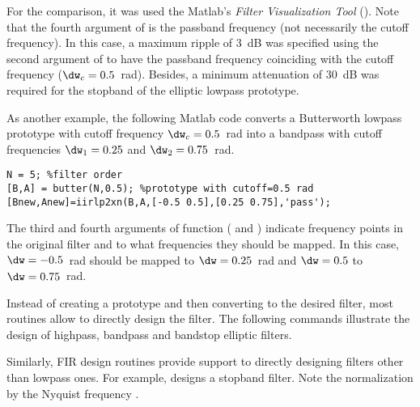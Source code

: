 For the comparison, it was used the Matlab's \emph{Filter Visualization Tool} (). Note that the fourth argument of  is the passband frequency (not necessarily the cutoff frequency). In this case, a maximum ripple of 3~dB was specified using the second argument of  to have the passband frequency coinciding with the cutoff frequency  ($\dw_c=0.5$~rad). Besides, a minimum attenuation of $30$~dB was required for the stopband of the elliptic lowpass prototype.

As another example, the following Matlab code converts a Butterworth lowpass prototype with cutoff frequency $\dw_c=0.5$~rad into a bandpass with cutoff frequencies $\dw_1=0.25$ and $\dw_2=0.75$~rad.
\begin{lstlisting}
N = 5; %filter order
[B,A] = butter(N,0.5); %prototype with cutoff=0.5 rad
[Bnew,Anew]=iirlp2xn(B,A,[-0.5 0.5],[0.25 0.75],'pass');
\end{lstlisting}
The third and fourth arguments of function  (\ci{[-0.5 0.5]} and \ci{[0.25 0.75]}) indicate frequency points in the original filter and to what frequencies they should be mapped. In this case, $\dw=-0.5$~rad should be mapped to $\dw=0.25$~rad and $\dw=0.5$ to $\dw=0.75$~rad.

Instead of creating a prototype and then converting to the desired filter, most routines allow to directly design the filter.
The following commands illustrate the design of highpass, bandpass and bandstop elliptic filters.

Similarly, FIR design routines provide support to directly designing filters other than lowpass ones. For example,   designs a stopband filter. Note the normalization by the Nyquist frequency .

